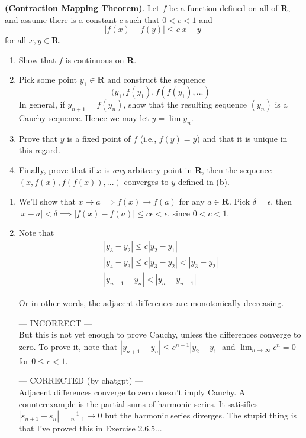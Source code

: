 \documentclass{oxmathproblems}
\begin{document}
\begin{questions}
\miquestion \textbf{(Contraction Mapping Theorem)}. Let $f$ be a function defined on all of \textbf{R}, and assume there is a constant $c$ such that $0 < c < 1$ and
\[|f(x)-f(y)| \leq c|x-y|\]
for all $x, y \in \textbf{R}$.
\begin{enumerate}[label=(\alph*)]
  \item Show that $f$ is continuous on \textbf{R}.
  \item Pick some point $y_{1} \in \textbf{R}$ and construct the sequence
  \[(y_{1}, f(y_{1}), f(f(y_{1}), ...)\]
  In general, if $y_{n+1}=f(y_{n})$, show that the resulting sequence $(y_{n})$ is a Cauchy sequence. Hence we may let $y = \lim y_{n}$.
  \item Prove that $y$ is a fixed point of $f$ (i.e., $f(y)=y$) and that it is unique in this regard.
  \item Finally, prove that if $x$ is \textit{any} arbitrary point in \textbf{R}, then the sequence $(x, f(x), f(f(x)), ...)$ converges to $y$ defined in (b).
\end{enumerate}

\begin{solution}
  \begin{enumerate}[label=(\alph*)]
    \item We'll show that $x \to a \implies f(x) \to f(a)$ for any $a \in \textbf{R}$. Pick $\delta=\epsilon$, then 
    $|x-a| < \delta \implies |f(x)-f(a)| \leq c\epsilon < \epsilon$, since $0 < c < 1$.
    \item Note that
    \begin{align*}
      |y_{3}-y_{2}| \leq c|y_{2}-y_{1}| \\
      |y_{4}-y_{3}| \leq c|y_{3}-y_{2}| < |y_{3}-y_{2}| \\
      |y_{n+1}-y_{n}| < |y_{n}-y_{n-1}|
    \end{align*}

    Or in other words, the adjacent differences are monotonically decreasing. 
    
    --- INCORRECT --- \\
    But this is not yet enough to prove Cauchy, unless the differences converge to zero.
    To prove it, note that $|y_{n+1}-y_{n}| \leq c^{n-1}|y_{2}-y_{1}|$ and $\lim_{n \to \infty}c^{n}=0$ for $0 \leq c < 1$.

    --- CORRECTED (by chatgpt) --- \\
    Adjacent differences converge to zero doesn't imply Cauchy. A counterexample is the partial sums of harmonic series. It satisifies $|s_{n+1}-s_{n}|=\frac{1}{n+1} \to 0$
    but the harmonic series diverges. The stupid thing is that I've proved this in Exercise 2.6.5...


\end{enumerate}
\end{solution}
\end{questions}
\end{document}
